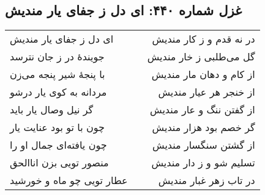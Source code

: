 \begin{center}
\section*{غزل شماره ۴۴۰: ای دل ز جفای یار مندیش}
\label{sec:440}
\begin{longtable}{l p{0.5cm} r}
ای دل ز جفای یار مندیش
&&
در نه قدم و ز کار مندیش
\\
جویندهٔ در ز جان نترسد
&&
گل می‌طلبی ز خار مندیش
\\
با پنجهٔ شیر پنجه می‌زن
&&
از کام و دهان مار مندیش
\\
مردانه به کوی یار درشو
&&
از خنجر هر عیار مندیش
\\
گر نیل وصال یار باید
&&
از گفتن ننگ و عار مندیش
\\
چون با تو بود عنایت یار
&&
گر خصم بود هزار مندیش
\\
چون یافته‌ای جمال او را
&&
از گشتن سنگسار مندیش
\\
منصور تویی بزن اناالحق
&&
تسلیم شو و ز دار مندیش
\\
عطار تویی چو ماه و خورشید
&&
در تاب زهر غبار مندیش
\\
\end{longtable}
\end{center}
